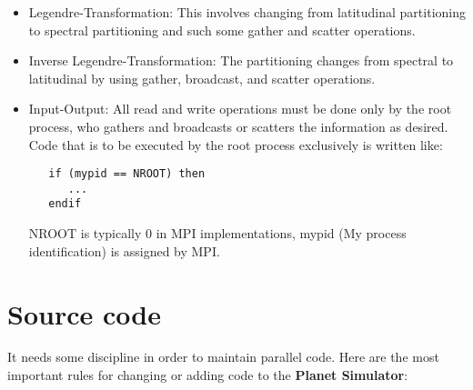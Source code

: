 \begin{itemize}

\item Legendre-Transformation: 
This involves changing from latitudinal partitioning to
spectral partitioning and such some gather and scatter
operations.

\item Inverse Legendre-Transformation:
The partitioning changes from spectral to latitudinal
by using gather, broadcast, and scatter operations.

\item Input-Output:
All read and write operations must be done only by
the root process, who gathers and broadcasts or
scatters the information as desired.
Code that is to be executed by the root process exclusively is 
written like:

\begin{verbatim}
   if (mypid == NROOT) then
      ...
   endif
\end{verbatim}

NROOT is typically 0 in MPI implementations,
mypid (My process identification) is assigned by MPI.

\end{itemize}


\section{Source code}

It needs some discipline in order to maintain parallel code.
Here are the most important rules for changing or adding code
to the {\bf Planet Simulator}:

